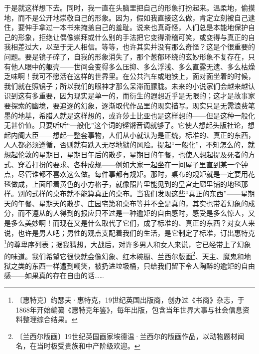 \documentclass[12pt,UTF-8,openany]{ctexbook}
\begin{document}
\begin{normalsize}
    于是就这样想下去。同时，我一直在头脑里把自己的形象打扮起来。温柔地，偷摸地，而不是公开地崇敬自己的形象。因为，假如我直接这么做，肯定立刻被自己逮住，要伸手拿过一本书来掩盖自己的羞耻。说来也真奇怪，人们总是本能地保护自己的形象，拒绝让偶像崇拜或什么别的手法把它变得滑稽可笑，或变得与真正的自我相差过大，以至于无人相信。等等，也许其实并没有那么奇怪？这是个很重要的问题。要是镜子碎了，自我的形象消失了，那个葱郁环绕的玄妙形象不复存在，只有他人眼中的躯壳——世间会变得多么压抑、多么浮浅、多么直露无遗、多么枯燥乏味啊！我可不愿活在这样的世界里。在公共汽车或地铁上，面对面坐着的时候，我们就在照镜子；所以我们的眼神才那么呆滞而朦胧。未来的小说家们会越来越认识到这有多重要，因为现实是单一的，而衍生的遐想近乎是无限的；这才是故事家要探索的幽境，要追逐的幻象，逐渐取代作品里的现实描写。现实只是无需浪费笔墨的地基，希腊人就是这样想的，或许莎士比亚也是这样想的——但是这种一般化无甚价值。只要听听“一般化”这个词的铿锵音调就够了。它使人想起头版社论，想起内阁大臣——想起一整套事物，人们从小就认为是正统，标准的、真正的东西，人人都必须遵循，否则就有跌入无尽地狱的风险。提起“一般化”，不知怎么的，就想起伦敦的星期日，星期日午后的散步，星期日的午餐，也使人想起提及死者的方式、穿着打扮的要求、各种成规——例如大家一起坐在一间屋子里直到某一个钟点，尽管谁都不喜欢这么做。每件事都有规矩。那时，桌布的规矩就是一定要用花毯做成，上面印着黄色的小方格子，就像照片里能见到的皇宫走廊里铺的地毯那样。别的式样的桌布就不能算真正的桌布。当我们发现这些“真正的东西”——星期天的午餐、星期天的散步、庄园宅第和桌布等并不全是真的，其实也带着幻象的成分，而不遵从的人得到的报应只不过是一种逾矩的自由感时，感受是多么惊人，又是多么美妙啊！而现在又是什么取代了它们，成了标准的、真正的东西？对女人来说，也许是男人吧；男性的观点支配着我们的生活，是它制定了标准，订出惠特克\footnote{〔惠特克〕约瑟夫·惠特克，19世纪英国出版商，创办过《书商》杂志，于1868年开始编纂《惠特克年鉴》，每年出版，包含当年世界大事与社会信息资料整理综合结果。}的尊卑序列表；据我猜想，大战后，对许多男人和女人来说，它已经带上了幻象的味道。我们希望它很快就会像幻象、红木碗橱、兰西尔版画\footnote{〔兰西尔版画〕19世纪英国画家埃德温·兰西尔的版画作品，以动物题材闻名，在当时极受贵族和中产阶级欢迎。}、天主、魔鬼和地狱之类的东西一样遭到嘲笑，被扔进垃圾桶，只给我们留下令人陶醉的逾矩的自由感——如果真的存在自由的话……
    

\end{normalsize}
\end{document}
